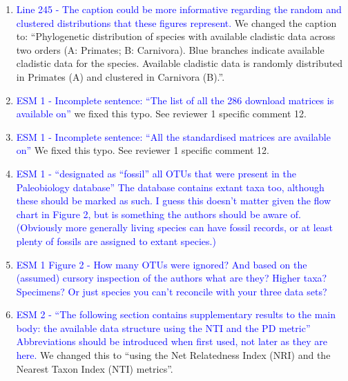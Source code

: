 \documentclass[12pt,letterpaper]{article}
\begin{document}
\begin{enumerate}
\item{\textcolor{blue}{Line 245 - The caption could be more informative regarding the random and clustered distributions that these figures represent.}}
We changed the caption to: ``Phylogenetic distribution of species with available cladistic data across two orders (A: Primates; B: Carnivora). Blue branches indicate available cladistic data for the species. Available cladistic data is randomly distributed in Primates (A) and clustered in Carnivora (B).''.

\item{\textcolor{blue}{ESM 1 - Incomplete sentence: ``The list of all the 286 download matrices is available on''}}
we fixed this typo. See reviewer 1 specific comment 12.

\item{\textcolor{blue}{ESM 1 - Incomplete sentence: ``All the standardised matrices are available on''}}
We fixed this typo. See reviewer 1 specific comment 12.

\item{\textcolor{blue}{ESM 1 - ``designated as ``fossil'' all OTUs that were present in the Paleobiology database'' The database contains extant taxa too, although these should be marked as such. I guess this doesn't matter given the flow chart in Figure 2, but is something the authors should be aware of. (Obviously more generally living species can have fossil records, or at least plenty of fossils are assigned to extant species.)}}

\item{\textcolor{blue}{ESM 1 Figure 2 - How many OTUs were ignored? And based on the (assumed) cursory inspection of the authors what are they? Higher taxa? Specimens? Or just species you can't reconcile with your three data sets?}}

\item{\textcolor{blue}{ESM 2 - ``The following section contains supplementary results to the main body: the available data structure using the NTI and the PD metric'' Abbreviations should be introduced when first used, not later as they are here.}}
We changed this to ``using the Net Relatedness Index (NRI) and the Nearest Taxon Index (NTI) metrics''.
\end{enumerate}
\end{document}
